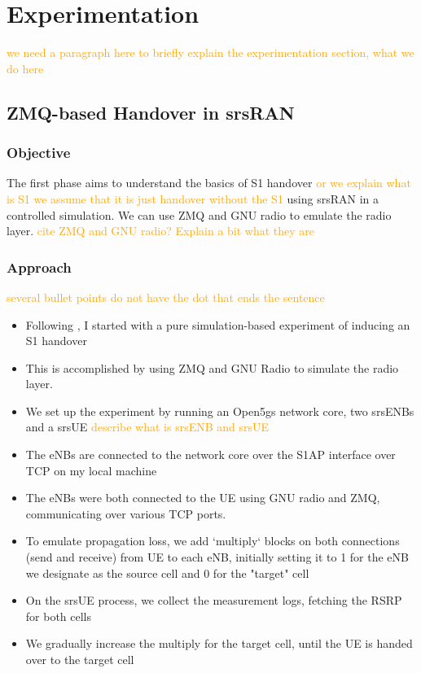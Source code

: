 \chapter{Experimentation}

\textcolor{orange}{we need a paragraph here to briefly explain the experimentation section, what we do here}

\section{ZMQ-based Handover in srsRAN}
\subsection{Objective}
The first phase aims to understand the basics of S1 handover \textcolor{orange}{or we explain what is S1 we assume that it is just handover without the S1} using srsRAN in a controlled simulation. We can use ZMQ and GNU radio to emulate the radio layer. \textcolor{orange}{cite ZMQ and GNU radio? Explain a bit what they are}

\subsection{Approach}

\textcolor{orange}{several bullet points do not have the dot that ends the sentence}

\begin{itemize}
    \item Following \cite{powell_handover_2021}, I started with a pure simulation-based experiment of inducing an S1 handover
    \item This is accomplished by using ZMQ and GNU Radio to simulate the radio layer.
    \item We set up the experiment by running an Open5gs network core, two srsENBs and a srsUE \textcolor{orange}{describe what is srsENB and srsUE}
    \item The eNBs are connected to the network core over the S1AP interface over TCP on my local machine
    \item The eNBs were both connected to the UE using GNU radio and ZMQ, communicating over various TCP ports.
    \item To emulate propagation loss, we add `multiply` blocks on both connections (send and receive) from UE to each eNB, initially setting it to 1 for the eNB we designate as the source cell and 0 for the "target" cell 
    \item On the srsUE process, we collect the measurement logs, fetching the RSRP for both cells
    \item We gradually increase the multiply for the target cell, until the UE is handed over to the target cell
\end{itemize}

